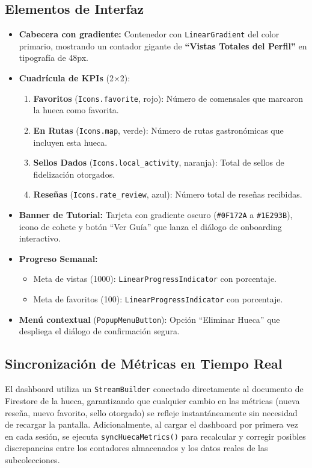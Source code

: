 \documentclass[11pt, a4paper, oneside]{report}
\begin{document}
\subsection{Elementos de Interfaz}
\begin{itemize}
  \item \textbf{Cabecera con gradiente:} Contenedor con \texttt{LinearGradient} del color primario, mostrando un contador gigante de \textbf{``Vistas Totales del Perfil''} en tipografía de 48px.
  \item \textbf{Cuadrícula de KPIs} (2$\times$2):
  \begin{enumerate}
    \item \textbf{Favoritos} (\texttt{Icons.favorite}, rojo): Número de comensales que marcaron la hueca como favorita.
    \item \textbf{En Rutas} (\texttt{Icons.map}, verde): Número de rutas gastronómicas que incluyen esta hueca.
    \item \textbf{Sellos Dados} (\texttt{Icons.local\_activity}, naranja): Total de sellos de fidelización otorgados.
    \item \textbf{Reseñas} (\texttt{Icons.rate\_review}, azul): Número total de reseñas recibidas.
  \end{enumerate}
  \item \textbf{Banner de Tutorial:} Tarjeta con gradiente oscuro (\texttt{\#0F172A} a \texttt{\#1E293B}), icono de cohete y botón ``Ver Guía'' que lanza el diálogo de onboarding interactivo.
  \item \textbf{Progreso Semanal:}
  \begin{itemize}
    \item Meta de vistas (1000): \texttt{LinearProgressIndicator} con porcentaje.
    \item Meta de favoritos (100): \texttt{LinearProgressIndicator} con porcentaje.
  \end{itemize}
  \item \textbf{Menú contextual} (\texttt{PopupMenuButton}): Opción ``Eliminar Hueca'' que despliega el diálogo de confirmación segura.
\end{itemize}

\subsection{Sincronización de Métricas en Tiempo Real}
El dashboard utiliza un \texttt{StreamBuilder} conectado directamente al documento de Firestore de la hueca, garantizando que cualquier cambio en las métricas (nueva reseña, nuevo favorito, sello otorgado) se refleje instantáneamente sin necesidad de recargar la pantalla. Adicionalmente, al cargar el dashboard por primera vez en cada sesión, se ejecuta \texttt{syncHuecaMetrics()} para recalcular y corregir posibles discrepancias entre los contadores almacenados y los datos reales de las subcolecciones.
\end{document}
